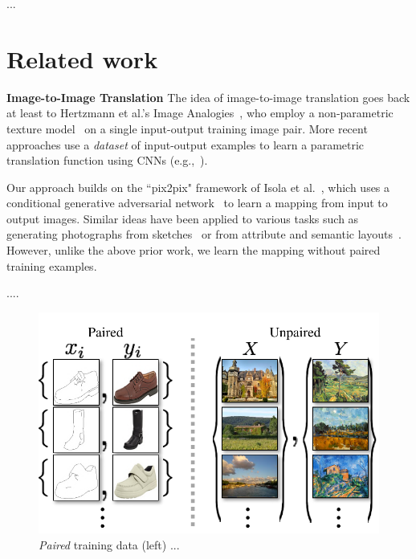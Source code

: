 \documentclass[10pt,letterpaper]{article}
\begin{document}
 ...
 
\section{Related work}
 

 

{\bf Image-to-Image Translation}
The idea of image-to-image translation goes back at least to Hertzmann et al.'s Image Analogies~\cite{hertzmann2001image}, who employ a non-parametric texture model~\cite{efros1999texture} on a single input-output training image pair.
More recent approaches use a \emph{dataset} of input-output examples to learn a parametric translation function using CNNs (e.g.,~\cite{long2015fully}). 

Our approach builds on the ``pix2pix" framework of Isola et al.~\cite{isola2016image}, which uses a conditional generative adversarial network~\cite{goodfellow2014generative} to learn a mapping from input to output images. Similar ideas have been applied to various tasks such as generating photographs from sketches~\cite{sangkloy2016scribbler} or from attribute and semantic layouts~\cite{karacan2016learning}. However, unlike the above prior work, we learn the mapping without paired training examples. 

....


\begin{figure}[h]
 \centering
 \includegraphics[scale=0.6]{paired_unpaired2.pdf}
 \vspace{-0.3in}
  \caption{\emph{Paired} training data (left)  ...}
 \vspace{-0.2in}
\end{figure}

\end{document}

